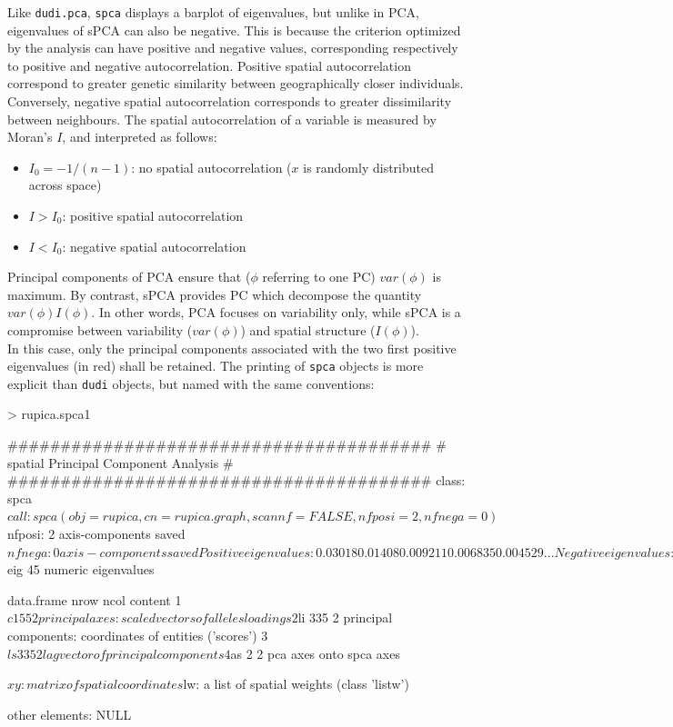 \documentclass{article}
\begin{document}
Like \texttt{dudi.pca}, \texttt{spca} displays a barplot of
eigenvalues, but unlike in PCA, eigenvalues of sPCA can also be negative.
This is because the criterion optimized by the analysis can have
positive and negative values, corresponding respectively to positive
and negative autocorrelation.
Positive spatial autocorrelation correspond to greater genetic similarity between geographically
closer individuals.
Conversely, negative spatial autocorrelation corresponds to greater dissimilarity between neighbours.
The spatial autocorrelation of a variable is measured by Moran's $I$, and interpreted as follows:
\begin{itemize}
  \item $I_0 = -1/(n-1)$: no spatial autocorrelation ($x$ is randomly distributed across space)
  \item $I > I_0$: positive spatial autocorrelation
  \item $I < I_0$: negative spatial autocorrelation
\end{itemize}

Principal components of PCA ensure that ($\phi$ referring to one PC) $var(\phi)$ is maximum.
By contrast, sPCA provides PC which decompose the quantity $var(\phi)I(\phi)$.
In other words, PCA focuses on variability only, while sPCA is a compromise between variability
($var(\phi)$) and spatial structure ($I(\phi)$).
\\


In this case, only the principal components associated with the two
first positive eigenvalues (in red) shall be retained.
The printing of \texttt{spca} objects is more explicit than
\texttt{dudi} objects, but named with the same conventions:
\begin{Schunk}
\begin{Sinput}
> rupica.spca1
\end{Sinput}
\begin{Soutput}
	########################################
	# spatial Principal Component Analysis #
	########################################
class: spca
$call: spca(obj = rupica, cn = rupica.graph, scannf = FALSE, nfposi = 2, 
    nfnega = 0)

$nfposi: 2 axis-components saved
$nfnega: 0 axis-components saved
Positive eigenvalues: 0.03018 0.01408 0.009211 0.006835 0.004529 ...
Negative eigenvalues: -0.008611 -0.006414 -0.004451 -0.003963 -0.003329 ...

  vector length mode    content    
1 $eig   45     numeric eigenvalues

  data.frame nrow ncol content                                                 
1 $c1        55   2    principal axes: scaled vectors of alleles loadings      
2 $li        335  2    principal components: coordinates of entities ('scores')
3 $ls        335  2    lag vector of principal components                      
4 $as        2    2    pca axes onto spca axes                                 

$xy: matrix of spatial coordinates
$lw: a list of spatial weights (class 'listw')

other elements: NULL
\end{Soutput}
\end{Schunk}
\end{document}
